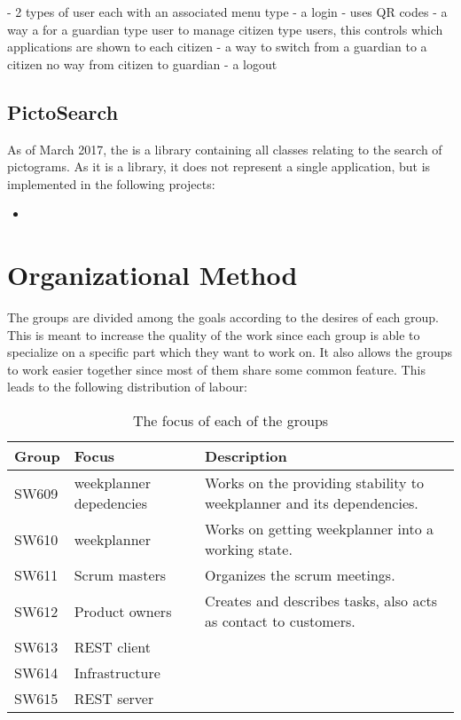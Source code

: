 - 2 types of user each with an associated menu type
- a login - uses QR codes
- a way a for a guardian type user to manage citizen type users, this
controls which applications are shown to each citizen
- a way to switch from a guardian to a citizen no way from citizen to guardian
- a logout


\subsection{PictoSearch}
As of March 2017, the  is a library containing all
classes relating to the search of pictograms. As it is a library, it does not
represent a single application, but is implemented in the following projects:
\begin{itemize}
  \item 
\end{itemize}


\section{Organizational Method}

The groups are divided among the goals according to the desires of each group.
This is meant to increase the quality of the work since each group is able to
specialize on a specific part which they want to work on. It also allows the
groups to work easier together since most of them share some common feature.
This leads to the following distribution of labour:

\begin{table}[H]
\centering
\begin{tabular}{|p{2cm}|p{3cm}|p{8cm}|}
\hline
Group & Focus & Description \\ \hline
SW609 & weekplanner depedencies & Works on the providing stability to
weekplanner and its dependencies.\\\hline 
SW610 & weekplanner & Works on getting weekplanner into a working
state.\\\hline 
SW611 & Scrum masters & Organizes the scrum meetings. \\\hline 
SW612 & Product owners & Creates and describes tasks, also acts as contact to
customers. \\\hline 
SW613 & REST client & \\ \hline

SW614 & Infrastructure & \\ \hline

SW615 & REST server & \\ \hline

\end{tabular}
\caption{The focus of each of the groups}
\label{GroupDivision}
\end{table}

